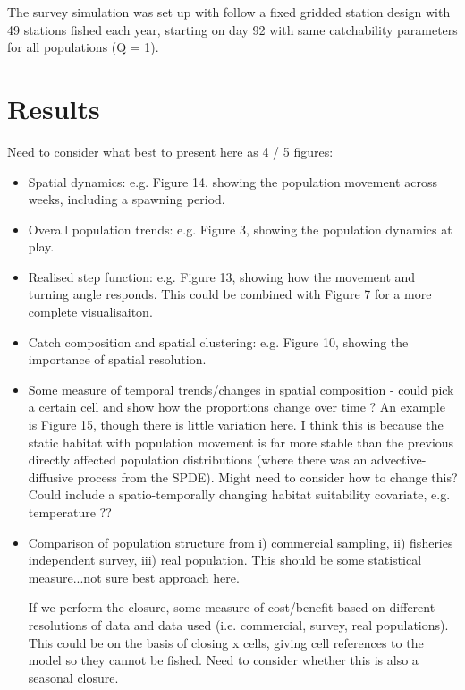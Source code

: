 \documentclass[review]{elsarticle}
\begin{document}
The survey simulation was set up with follow a fixed gridded station design
with 49 stations fished each year, starting on day 92 with same catchability
parameters for all populations (Q = 1). 

\section{Results}

Need to consider what best to present here as 4 / 5 figures:

\begin{itemize}
	\item Spatial dynamics: e.g. Figure 14. showing the population movement
		across weeks, including a spawning period.
	\item Overall population trends: e.g. Figure 3, showing the population
		dynamics at play.
	\item Realised step function: e.g. Figure 13, showing how the movement
		and turning angle responds. This could be combined with Figure
		7 for a more complete visualisaiton.
	\item Catch composition and spatial clustering: e.g. Figure 10, showing
		the importance of spatial resolution.
	\item Some measure of temporal trends/changes in spatial composition -
		could pick a certain cell and show how the proportions change
		over time ? An example is Figure 15, though there is little
		variation here. I think this is because the static habitat with
		population movement is far more stable than the previous
		directly affected population distributions (where there was an
		advective-diffusive process from the SPDE). Might need to
		consider how to change this?  Could include a spatio-temporally
		changing habitat suitability covariate, e.g. temperature ??
	\item Comparison of population structure from i) commercial sampling,
		ii) fisheries independent survey, iii) real population. This
		should be some statistical measure...not sure best approach
		here.
	\item [If we perform the closure, some measure of cost/benefit based on
		different resolutions of data and data used (i.e. commercial,
		survey, real populations). This could be on the basis of
		closing x cells, giving cell references to the model so they
		cannot be fished. Need to consider whether this is also a
		seasonal closure.]
\end{itemize} 
\end{document}
